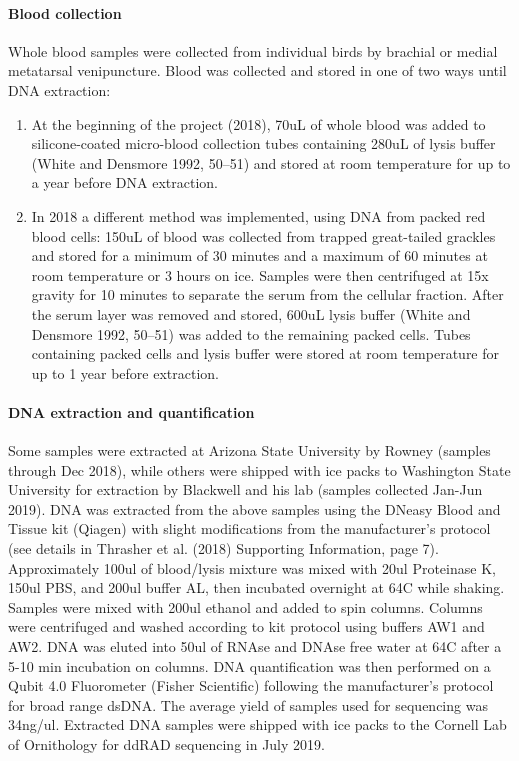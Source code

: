 \documentclass[
]{article}
\begin{document}
\hypertarget{blood-collection}{%
\paragraph{Blood collection}\label{blood-collection}}

Whole blood samples were collected from individual birds by brachial or
medial metatarsal venipuncture. Blood was collected and stored in one of
two ways until DNA extraction:

\begin{enumerate}
\def\labelenumi{\arabic{enumi})}
\item
  At the beginning of the project (2018), 70uL of whole blood was added
  to silicone-coated micro-blood collection tubes containing 280uL of
  lysis buffer (White and Densmore 1992, 50--51) and stored at room
  temperature for up to a year before DNA extraction.
\item
  In 2018 a different method was implemented, using DNA from packed red
  blood cells: 150uL of blood was collected from trapped great-tailed
  grackles and stored for a minimum of 30 minutes and a maximum of 60
  minutes at room temperature or 3 hours on ice. Samples were then
  centrifuged at 15x gravity for 10 minutes to separate the serum from
  the cellular fraction. After the serum layer was removed and stored,
  600uL lysis buffer (White and Densmore 1992, 50--51) was added to the
  remaining packed cells. Tubes containing packed cells and lysis buffer
  were stored at room temperature for up to 1 year before extraction.
\end{enumerate}

\hypertarget{dna-extraction-and-quantification}{%
\paragraph{DNA extraction and
quantification}\label{dna-extraction-and-quantification}}

Some samples were extracted at Arizona State University by Rowney
(samples through Dec 2018), while others were shipped with ice packs to
Washington State University for extraction by Blackwell and his lab
(samples collected Jan-Jun 2019). DNA was extracted from the above
samples using the DNeasy Blood and Tissue kit (Qiagen) with slight
modifications from the manufacturer's protocol (see details in Thrasher
et al. (2018) Supporting Information, page 7). Approximately 100ul of
blood/lysis mixture was mixed with 20ul Proteinase K, 150ul PBS, and
200ul buffer AL, then incubated overnight at 64C while shaking. Samples
were mixed with 200ul ethanol and added to spin columns. Columns were
centrifuged and washed according to kit protocol using buffers AW1 and
AW2. DNA was eluted into 50ul of RNAse and DNAse free water at 64C after
a 5-10 min incubation on columns. DNA quantification was then performed
on a Qubit 4.0 Fluorometer (Fisher Scientific) following the
manufacturer's protocol for broad range dsDNA. The average yield of
samples used for sequencing was 34ng/ul. Extracted DNA samples were
shipped with ice packs to the Cornell Lab of Ornithology for ddRAD
sequencing in July 2019.
\end{document}

